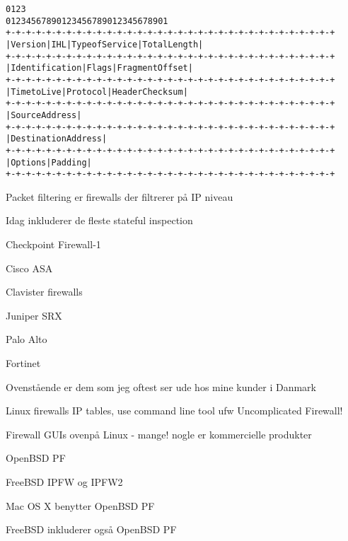 \documentclass[Screen16to9,17pt]{foils}
\begin{document}
\begin{alltt}\footnotesize
0                   1                   2                   3
0 1 2 3 4 5 6 7 8 9 0 1 2 3 4 5 6 7 8 9 0 1 2 3 4 5 6 7 8 9 0 1
+-+-+-+-+-+-+-+-+-+-+-+-+-+-+-+-+-+-+-+-+-+-+-+-+-+-+-+-+-+-+-+-+
|Version|  IHL  |Type of Service|          Total Length         |
+-+-+-+-+-+-+-+-+-+-+-+-+-+-+-+-+-+-+-+-+-+-+-+-+-+-+-+-+-+-+-+-+
|         Identification        |Flags|      Fragment Offset    |
+-+-+-+-+-+-+-+-+-+-+-+-+-+-+-+-+-+-+-+-+-+-+-+-+-+-+-+-+-+-+-+-+
|  Time to Live |    Protocol   |         Header Checksum       |
+-+-+-+-+-+-+-+-+-+-+-+-+-+-+-+-+-+-+-+-+-+-+-+-+-+-+-+-+-+-+-+-+
|                       Source Address                          |
+-+-+-+-+-+-+-+-+-+-+-+-+-+-+-+-+-+-+-+-+-+-+-+-+-+-+-+-+-+-+-+-+
|                    Destination Address                        |
+-+-+-+-+-+-+-+-+-+-+-+-+-+-+-+-+-+-+-+-+-+-+-+-+-+-+-+-+-+-+-+-+
|                    Options                    |    Padding    |
+-+-+-+-+-+-+-+-+-+-+-+-+-+-+-+-+-+-+-+-+-+-+-+-+-+-+-+-+-+-+-+-+
\end{alltt}

\begin{list1}
\item Packet filtering er firewalls der filtrerer på IP niveau
\item Idag inkluderer de fleste stateful inspection
\end{list1}

\begin{list2}
\item Checkpoint Firewall-1 
\item Cisco ASA 
\item Clavister firewalls 
\item Juniper SRX 
\item Palo Alto 
\item Fortinet 
\end{list2}

Ovenstående er dem som jeg oftest ser ude hos mine kunder i Danmark

\begin{list2}
\item Linux firewalls IP tables, use command line tool ufw Uncomplicated Firewall!
\item Firewall GUIs ovenpå Linux - mange!
nogle er kommercielle produkter
\item OpenBSD PF
\item FreeBSD IPFW og IPFW2 
\item Mac OS X benytter OpenBSD PF
\item FreeBSD inkluderer også OpenBSD PF
\end{list2}
\end{document}
